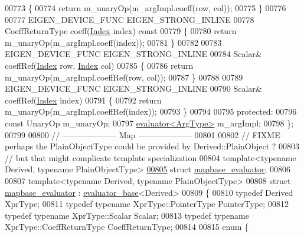 \begin{DoxyCode}
00773 \textcolor{keyword}{  }\{
00774     \textcolor{keywordflow}{return} m\_unaryOp(m\_argImpl.coeff(row, col));
00775   \}
00776 
00777   EIGEN\_DEVICE\_FUNC EIGEN\_STRONG\_INLINE
00778   CoeffReturnType coeff(\hyperlink{namespace_eigen_a62e77e0933482dafde8fe197d9a2cfde}{Index} index)\textcolor{keyword}{ const}
00779 \textcolor{keyword}{  }\{
00780     \textcolor{keywordflow}{return} m\_unaryOp(m\_argImpl.coeff(index));
00781   \}
00782 
00783   EIGEN\_DEVICE\_FUNC EIGEN\_STRONG\_INLINE
00784   Scalar& coeffRef(\hyperlink{namespace_eigen_a62e77e0933482dafde8fe197d9a2cfde}{Index} row, \hyperlink{namespace_eigen_a62e77e0933482dafde8fe197d9a2cfde}{Index} col)
00785   \{
00786     \textcolor{keywordflow}{return} m\_unaryOp(m\_argImpl.coeffRef(row, col));
00787   \}
00788 
00789   EIGEN\_DEVICE\_FUNC EIGEN\_STRONG\_INLINE
00790   Scalar& coeffRef(\hyperlink{namespace_eigen_a62e77e0933482dafde8fe197d9a2cfde}{Index} index)
00791   \{
00792     \textcolor{keywordflow}{return} m\_unaryOp(m\_argImpl.coeffRef(index));
00793   \}
00794 
00795 \textcolor{keyword}{protected}:
00796   \textcolor{keyword}{const} UnaryOp m\_unaryOp;
00797   \hyperlink{struct_eigen_1_1internal_1_1evaluator}{evaluator<ArgType>} m\_argImpl;
00798 \};
00799 
00800 \textcolor{comment}{// -------------------- Map --------------------}
00801 
00802 \textcolor{comment}{// FIXME perhaps the PlainObjectType could be provided by Derived::PlainObject ?}
00803 \textcolor{comment}{// but that might complicate template specialization}
00804 \textcolor{keyword}{template}<\textcolor{keyword}{typename} Derived, \textcolor{keyword}{typename} PlainObjectType>
\hyperlink{struct_eigen_1_1internal_1_1mapbase__evaluator}{00805} \textcolor{keyword}{struct }\hyperlink{struct_eigen_1_1internal_1_1mapbase__evaluator}{mapbase\_evaluator};
00806 
00807 \textcolor{keyword}{template}<\textcolor{keyword}{typename} Derived, \textcolor{keyword}{typename} PlainObjectType>
00808 \textcolor{keyword}{struct }\hyperlink{struct_eigen_1_1internal_1_1mapbase__evaluator}{mapbase\_evaluator} : \hyperlink{struct_eigen_1_1internal_1_1evaluator__base}{evaluator\_base}<Derived>
00809 \{
00810   \textcolor{keyword}{typedef} Derived  XprType;
00811   \textcolor{keyword}{typedef} \textcolor{keyword}{typename} XprType::PointerType PointerType;
00812   \textcolor{keyword}{typedef} \textcolor{keyword}{typename} XprType::Scalar Scalar;
00813   \textcolor{keyword}{typedef} \textcolor{keyword}{typename} XprType::CoeffReturnType CoeffReturnType;
00814   
00815   \textcolor{keyword}{enum} \{

\end{DoxyCode}
